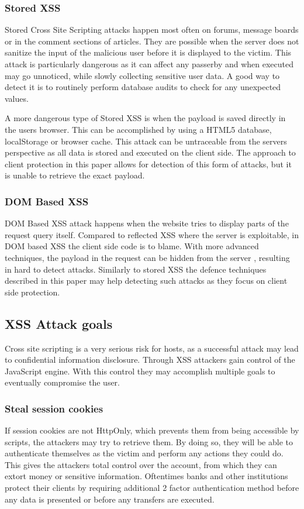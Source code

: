 \subsubsection{Stored XSS}
Stored Cross Site Scripting attacks happen most often on forums, message boards or in the comment sections of articles.
They are possible when the server does not sanitize the input of the malicious user before it is displayed to the victim.
This attack is particularly dangerous as it can affect any passerby and when executed may go unnoticed, while slowly collecting sensitive user data.
A good way to detect it is to routinely perform database audits to check for any unexpected values.

A more dangerous type of Stored XSS is when the payload is saved directly in the users browser.
This can be accomplished by using a HTML5 database, localStorage or browser cache.
This attack can be untraceable from the servers perspective as all data is stored and executed on the client side.
The approach to client protection in this paper allows for detection of this form of attacks, but it is unable to retrieve the exact payload.

\subsubsection{DOM Based XSS}
DOM Based XSS attack happens when the website tries to display parts of the request query itself.
Compared to reflected XSS where the server is exploitable, in DOM based XSS the client side code is to blame.
With more advanced techniques, the payload in the request can be hidden from the server \cite{domxss}, resulting in hard to detect attacks.
Similarly to stored XSS the defence techniques described in this paper may help detecting such attacks as they focus on client side protection.

\subsection{XSS Attack goals}
Cross site scripting is a very serious risk for hosts, as a successful attack may lead to confidential information disclosure.
Through XSS attackers gain control of the JavaScript engine.
With this control they may accomplish multiple goals to eventually compromise the user.

\subsubsection{Steal session cookies}
If session cookies are not HttpOnly, which prevents them from being accessible by scripts, the attackers may try to retrieve them.
By doing so, they will be able to authenticate themselves as the victim and perform any actions they could do.
This gives the attackers total control over the account, from which they can extort money or sensitive information.
Oftentimes banks and other institutions protect their clients by requiring additional 2 factor authentication method before any data is presented or before any transfers are executed.


